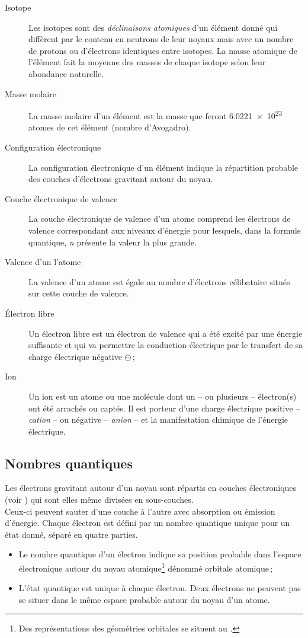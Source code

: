 \begin{description}
	\item[Isotope]
Les isotopes sont des \emph{déclinaisons atomiques} d'un élément donné qui diffèrent par le contenu en neutrons de leur noyaux mais avec un nombre de protons ou d'électrons identiques entre isotopes. La masse atomique de l'élément fait la moyenne des masses de chaque isotope selon leur abondance naturelle.
	\item[Masse molaire]
La masse molaire d'un élément est la masse que feront \num{6,0221e23} atomes de cet élément (nombre d'Avogadro).
	\item[Configuration électronique]
La configuration électronique d'un élément indique la répartition probable des couches d'électrons gravitant autour du noyau.
	\item[Couche électronique de valence]
La couche électronique de valence d'un atome comprend les électrons de valence correspondant aux
niveaux d'énergie pour lesquels, dans la formule quantique, \emph{n} présente la valeur la plus grande.
	\item[Valence d'un l'atome]
La valence d'un atome est égale au nombre d'électrons célibataire situés sur cette couche de valence.
	\item[\'Electron libre]
Un électron libre est un électron de valence qui a été excité par une énergie suffisante et qui va permettre la conduction électrique par le transfert de sa charge électrique négative $\ominus$\,;
	\item[Ion]
Un ion est un atome ou une molécule dont un -- ou plusieurs -- électron(s) ont été arrachés ou captés. Il est porteur d'une charge électrique positive -- \emph{cation} -- ou négative -- \emph{anion} -- et la manifestation chimique de l'énergie électrique.
\end{description}

\subsection{Nombres quantiques}

Les électrons gravitant autour d'un noyau sont répartis en couches électroniques (voir ) qui sont elles même divisées en sous-couches.\\Ceux-ci peuvent sauter d'une couche à l'autre avec absorption ou émission d'énergie. Chaque électron est défini par un nombre quantique unique pour un état donné, séparé en quatre parties.

\begin{itemize}
	\item Le nombre quantique d'un électron indique sa position probable dans l'espace électronique autour du noyau atomique\footnote{Des représentations des géométries orbitales se situent au .} dénommé orbitale atomique\,;
	\item L'état quantique est unique à chaque électron. Deux électrons ne peuvent pas se situer dans le même espace probable autour du noyau d'un atome.
\end{itemize}

